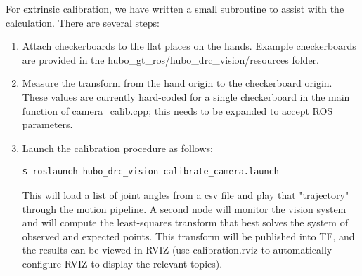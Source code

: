 \documentclass[letterpaper, 10 pt]{report}
\begin{document}
For extrinsic calibration, we have written a small subroutine to assist with the calculation.
There are several steps:
\begin{enumerate}
  \item Attach checkerboards to the flat places on the hands. Example checkerboards are provided in the hubo\_gt\_ros/hubo\_drc\_vision/resources folder.
  \item Measure the transform from the hand origin to the checkerboard origin. These values are currently hard-coded for a single checkerboard in the main function of camera\_calib.cpp; this needs to be expanded to accept ROS parameters.
  \item Launch the calibration procedure as follows:
  \begin{lstlisting}[language=bash]
    $ roslaunch hubo_drc_vision calibrate_camera.launch
  \end{lstlisting}
  This will load a list of joint angles from a csv file and play that "trajectory" through the motion pipeline. A second node will monitor the vision system and will compute the least-squares transform that best solves the system of observed and expected points. This transform will be published into TF, and the results can be viewed in RVIZ (use calibration.rviz to automatically configure RVIZ to display the relevant topics).
\end{enumerate}

\pagebreak
\end{document}
